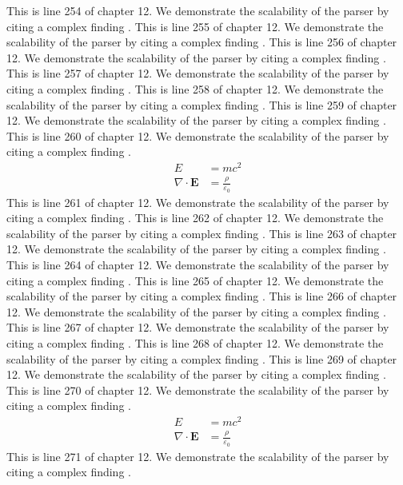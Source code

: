 This is line 254 of chapter 12. We demonstrate the scalability of the parser by citing a complex finding \cite{ref12_254}.
This is line 255 of chapter 12. We demonstrate the scalability of the parser by citing a complex finding \cite{ref12_255}.
This is line 256 of chapter 12. We demonstrate the scalability of the parser by citing a complex finding \cite{ref12_256}.
This is line 257 of chapter 12. We demonstrate the scalability of the parser by citing a complex finding \cite{ref12_257}.
This is line 258 of chapter 12. We demonstrate the scalability of the parser by citing a complex finding \cite{ref12_258}.
This is line 259 of chapter 12. We demonstrate the scalability of the parser by citing a complex finding \cite{ref12_259}.
This is line 260 of chapter 12. We demonstrate the scalability of the parser by citing a complex finding \cite{ref12_260}.
\begin{align*}
  E &= mc^2 \\
  \nabla \cdot \mathbf{E} &= \frac{\rho}{\varepsilon_0}
\end{align*}
This is line 261 of chapter 12. We demonstrate the scalability of the parser by citing a complex finding \cite{ref12_261}.
This is line 262 of chapter 12. We demonstrate the scalability of the parser by citing a complex finding \cite{ref12_262}.
This is line 263 of chapter 12. We demonstrate the scalability of the parser by citing a complex finding \cite{ref12_263}.
This is line 264 of chapter 12. We demonstrate the scalability of the parser by citing a complex finding \cite{ref12_264}.
This is line 265 of chapter 12. We demonstrate the scalability of the parser by citing a complex finding \cite{ref12_265}.
This is line 266 of chapter 12. We demonstrate the scalability of the parser by citing a complex finding \cite{ref12_266}.
This is line 267 of chapter 12. We demonstrate the scalability of the parser by citing a complex finding \cite{ref12_267}.
This is line 268 of chapter 12. We demonstrate the scalability of the parser by citing a complex finding \cite{ref12_268}.
This is line 269 of chapter 12. We demonstrate the scalability of the parser by citing a complex finding \cite{ref12_269}.
This is line 270 of chapter 12. We demonstrate the scalability of the parser by citing a complex finding \cite{ref12_270}.
\begin{align*}
  E &= mc^2 \\
  \nabla \cdot \mathbf{E} &= \frac{\rho}{\varepsilon_0}
\end{align*}
This is line 271 of chapter 12. We demonstrate the scalability of the parser by citing a complex finding \cite{ref12_271}.
